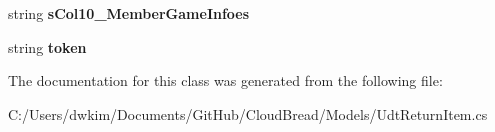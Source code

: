 \begin{DoxyCompactItemize}
\item 
string {\bfseries s\+Col10\+\_\+\+Member\+Game\+Infoes}\hypertarget{a00113_a6b80326c23cda9e4c766f6cdcacfe0b9}{}\label{a00113_a6b80326c23cda9e4c766f6cdcacfe0b9}

\item 
string {\bfseries token}\hypertarget{a00113_a2ecbc370552a85837de0224f4fe3ae6c}{}\label{a00113_a2ecbc370552a85837de0224f4fe3ae6c}

\end{DoxyCompactItemize}


The documentation for this class was generated from the following file\+:\begin{DoxyCompactItemize}
\item 
C\+:/\+Users/dwkim/\+Documents/\+Git\+Hub/\+Cloud\+Bread/\+Models/Udt\+Return\+Item.\+cs\end{DoxyCompactItemize}
